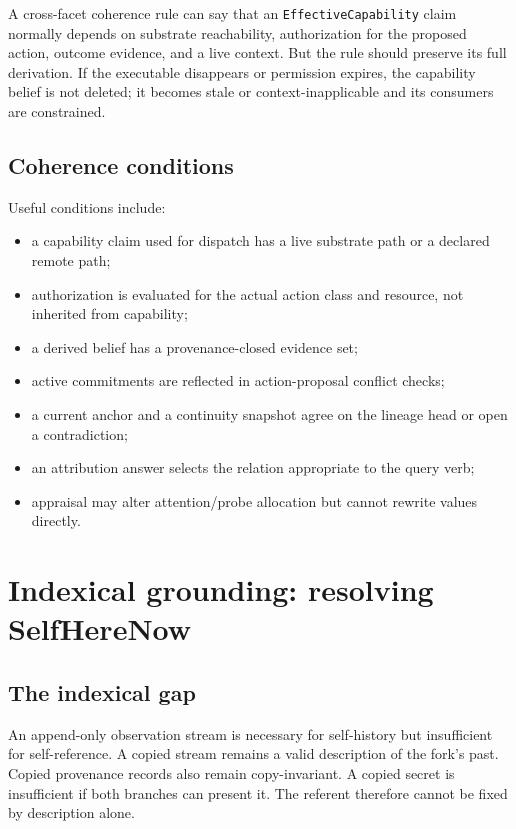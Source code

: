 \documentclass[11pt,oneside]{report}
\begin{document}
A cross-facet coherence rule can say that an \texttt{EffectiveCapability} claim normally depends on substrate reachability, authorization for the proposed action, outcome evidence, and a live context. But the rule should preserve its full derivation. If the executable disappears or permission expires, the capability belief is not deleted; it becomes stale or context-inapplicable and its consumers are constrained.

\section{Coherence conditions}

Useful conditions include:

\begin{itemize}
  \item a capability claim used for dispatch has a live substrate path or a declared remote path;
  \item authorization is evaluated for the actual action class and resource, not inherited from capability;
  \item a derived belief has a provenance-closed evidence set;
  \item active commitments are reflected in action-proposal conflict checks;
  \item a current anchor and a continuity snapshot agree on the lineage head or open a contradiction;
  \item an attribution answer selects the relation appropriate to the query verb;
  \item appraisal may alter attention/probe allocation but cannot rewrite values directly.
\end{itemize}

\chapter{Indexical grounding: resolving SelfHereNow}

\section{The indexical gap}

An append-only observation stream is necessary for self-history but insufficient for self-reference. A copied stream remains a valid description of the fork's past. Copied provenance records also remain copy-invariant. A copied secret is insufficient if both branches can present it. The referent therefore cannot be fixed by description alone.
\end{document}
